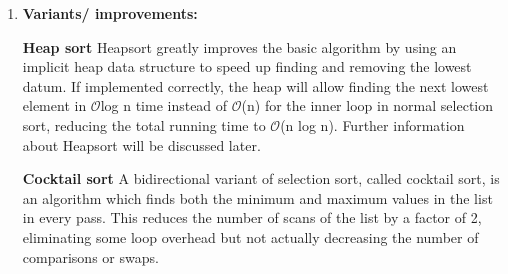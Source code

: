 \documentclass[11pt,a4paper]{article}
\begin{document}
{\begin{enumerate}[label=\textbf{\arabic*})]
				\item \textbf{Variants/ improvements:}
				
					\textbf{Heap sort}
					Heapsort greatly improves the basic algorithm by using an implicit heap data structure to speed up finding and removing the lowest datum. If implemented correctly, the heap will allow finding the next lowest element in $\mathcal{O}$log n time instead of $\mathcal{O}$(n) for the inner loop in normal selection sort, reducing the total running time to $\mathcal{O}$(n log n). Further information about Heapsort will be discussed later.
					
					\textbf{Cocktail sort}
					A bidirectional variant of selection sort, called cocktail sort, is an algorithm which finds both the minimum and maximum values in the list in every pass. This reduces the number of scans of the list by a factor of 2, eliminating some loop overhead but not actually decreasing the number of comparisons or swaps. 
					

\end{enumerate}}
\end{document}
